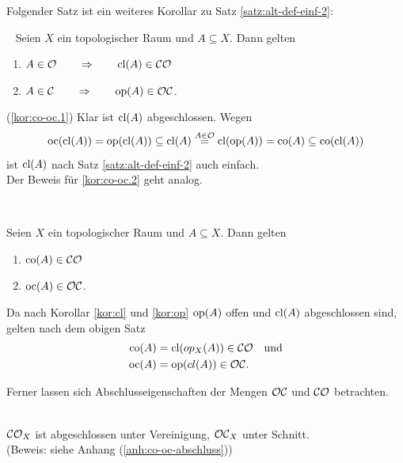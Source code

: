     Folgender Satz ist ein weiteres Korollar zu Satz \ref{satz:alt-def-einf-2}:
    \begin{kor} \label{kor:co-oc} \ \vspace{8pt}
        \noindent
        Seien $X$ ein topologischer Raum und $A \subseteq X$. Dann gelten
        \begin{enumerate}
            \item \label{kor:co-oc.1} $A \in \mathcal{O} \quad \quad \Rightarrow \quad \quad \text{cl}(A) \in \mathcal{CO}$
            \item \label{kor:co-oc.2} $A \in \mathcal{C} \quad \quad \Rightarrow \quad \quad \text{op}(A) \in \mathcal{OC}$.
        \end{enumerate}
    \end{kor}
    \begin{bew}
        (\ref{kor:co-oc.1}) Klar ist $\text{cl}(A)$ abgeschlossen. Wegen
        $$\text{oc}(\text{cl}(A)) = \text{op}(\text{cl}(A)) \subseteq \text{cl}(A) 
        \overset{A \in \mathcal{O}}{=} \text{cl}(\text{op}(A)) = \text{co}(A) \subseteq \text{co}(\text{cl}(A)) $$
        ist $\text{cl}(A)$ nach Satz \ref{satz:alt-def-einf-2} auch einfach.\\
        Der Beweis für \ref{kor:co-oc.2} geht analog.
    \end{bew}

    \begin{kor} \label{kor:co-CO-oc-OC} \ \vspace{8pt}

        \noindent
        Seien $X$ ein topologischer Raum und $A \subseteq X$. Dann gelten
        \begin{enumerate}
            \item \label{kor:co-CO-oc-OC.1} $\text{co}(A) \in \mathcal{CO}$
            \item \label{kor:co-CO-oc-OC.2} $\text{oc}(A) \in \mathcal{OC}$.
        \end{enumerate}
    \end{kor}
    \begin{bew}
    Da nach Korollar \ref{kor:cl} und \ref{kor:op} $\text{op}(A)$ offen und $\text{cl}(A)$ abgeschlossen sind, gelten nach dem obigen Satz
        \begin{align*}
            \text{co}(A) &= \text{cl}(op_X(A)) \in \mathcal{CO} \quad \text{und}\\
            \text{oc}(A) &= \text{op}(cl(A)) \in \mathcal{OC}.
        \end{align*}
    \end{bew}
    
    
    Ferner
    lassen sich Abschlusseigenschaften der Mengen $\mathcal{OC}$ und $\mathcal{CO}$ betrachten.
    \begin{satz}\label{kor:co-oc-abschluss}\ \\
        $\mathcal{CO}_X$ ist abgeschlossen unter Vereinigung, $\mathcal{OC}_X$ unter Schnitt.\\
        (Beweis: siehe Anhang (\ref{anh:co-oc-abschluss}))
    \end{satz}
    
